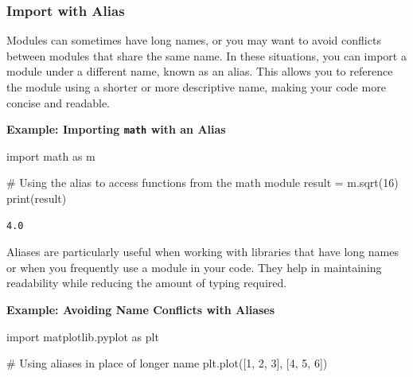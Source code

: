 \documentclass[
  letterpaper,
  DIV=11,
  numbers=noendperiod]{scrreprt}
\newenvironment{Shaded}{\begin{snugshade}}{\end{snugshade}}
\newcommand{\BuiltInTok}[1]{\textcolor[rgb]{0.00,0.23,0.31}{#1}}
\newcommand{\CommentTok}[1]{\textcolor[rgb]{0.37,0.37,0.37}{#1}}
\newcommand{\DecValTok}[1]{\textcolor[rgb]{0.68,0.00,0.00}{#1}}
\newcommand{\ImportTok}[1]{\textcolor[rgb]{0.00,0.46,0.62}{#1}}
\newcommand{\NormalTok}[1]{\textcolor[rgb]{0.00,0.23,0.31}{#1}}
\newcommand{\OperatorTok}[1]{\textcolor[rgb]{0.37,0.37,0.37}{#1}}
\begin{document}
\hypertarget{import-with-alias}{%
\subsubsection{Import with Alias}\label{import-with-alias}}

Modules can sometimes have long names, or you may want to avoid
conflicts between modules that share the same name. In these situations,
you can import a module under a different name, known as an alias. This
allows you to reference the module using a shorter or more descriptive
name, making your code more concise and readable.

\textbf{Example: Importing \texttt{math} with an Alias}

\begin{Shaded}
\begin{Highlighting}[]
\ImportTok{import}\NormalTok{ math }\ImportTok{as}\NormalTok{ m}

\CommentTok{\# Using the alias to access functions from the math module}
\NormalTok{result }\OperatorTok{=}\NormalTok{ m.sqrt(}\DecValTok{16}\NormalTok{)}
\BuiltInTok{print}\NormalTok{(result) }
\end{Highlighting}
\end{Shaded}

\begin{verbatim}
4.0
\end{verbatim}

Aliases are particularly useful when working with libraries that have
long names or when you frequently use a module in your code. They help
in maintaining readability while reducing the amount of typing required.

\textbf{Example: Avoiding Name Conflicts with Aliases}

\begin{Shaded}
\begin{Highlighting}[]
\ImportTok{import}\NormalTok{ matplotlib.pyplot }\ImportTok{as}\NormalTok{ plt}

\CommentTok{\# Using aliases in place of longer name}
\NormalTok{plt.plot([}\DecValTok{1}\NormalTok{, }\DecValTok{2}\NormalTok{, }\DecValTok{3}\NormalTok{], [}\DecValTok{4}\NormalTok{, }\DecValTok{5}\NormalTok{, }\DecValTok{6}\NormalTok{])}
\end{Highlighting}
\end{Shaded}
\end{document}
